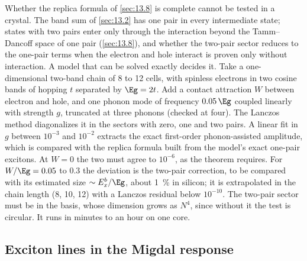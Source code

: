 Whether the replica formula of \cref{sec:13.8} is complete cannot be tested in a crystal. The band sum of \cref{sec:13.2} has one pair in every intermediate state; states with two pairs enter only through the interaction beyond the Tamm--Dancoff space of one pair (\cref{sec:13.8}), and whether the two-pair sector reduces to the one-pair terms when the electron and hole interact is proven only without interaction. A model that can be solved exactly decides it. Take a one-dimensional two-band chain of 8 to 12 cells, with spinless electrons in two cosine bands of hopping $t$ separated by $\Eg = 2t$. Add a contact attraction $W$ between electron and hole, and one phonon mode of frequency $0.05\,\Eg$ coupled linearly with strength $g$, truncated at three phonons (checked at four). The Lanczos method diagonalizes it in the sectors with zero, one and two pairs. A linear fit in $g$ between $10^{-3}$ and $10^{-2}$ extracts the exact first-order phonon-assisted amplitude, which is compared with the replica formula built from the model's exact one-pair excitons. At $W = 0$ the two must agree to $10^{-6}$, as the theorem requires. For $W/\Eg = 0.05$ to 0.3 the deviation is the two-pair correction, to be compared with its estimated size $\sim E_x^b/\Eg$, about \SI{1}{\percent} in silicon; it is extrapolated in the chain length (8, 10, 12) with a Lanczos residual below $10^{-10}$. The two-pair sector must be in the basis, whose dimension grows as $N^4$, since without it the test is circular. It runs in minutes to an hour on one core.

\subsection{Exciton lines in the Migdal response}

